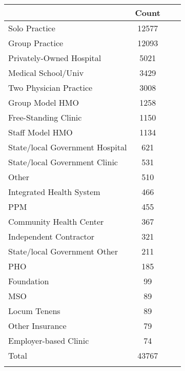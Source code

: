  \begin{tabular}{l*{1}{ccc}}
\midrule
                    &       Count\\
\midrule
Solo Practice       &       12577\\
\addlinespace
Group Practice      &       12093\\
\addlinespace
Privately-Owned Hospital&        5021\\
\addlinespace
 Medical School/Univ&        3429\\
\addlinespace
Two Physician Practice&        3008\\
\addlinespace
Group Model HMO     &        1258\\
\addlinespace
Free-Standing Clinic&        1150\\
\addlinespace
Staff Model HMO     &        1134\\
\addlinespace
State/local Government Hospital&         621\\
\addlinespace
State/local Government Clinic&         531\\
\addlinespace
Other               &         510\\
\addlinespace
Integrated Health System&         466\\
\addlinespace
PPM                 &         455\\
\addlinespace
Community Health Center&         367\\
\addlinespace
Independent Contractor&         321\\
\addlinespace
State/local Government Other&         211\\
\addlinespace
PHO                 &         185\\
\addlinespace
Foundation          &          99\\
\addlinespace
MSO                 &          89\\
\addlinespace
Locum Tenens        &          89\\
\addlinespace
Other Insurance     &          79\\
\addlinespace
Employer-based Clinic&          74\\
\addlinespace
Total               &       43767\\
\addlinespace
\midrule
\midrule
\end{tabular}
